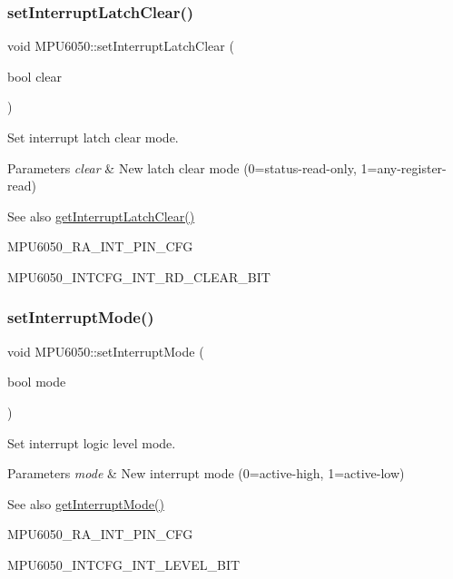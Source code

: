 \subsubsection{\texorpdfstring{setInterruptLatchClear()}{setInterruptLatchClear()}}
{\footnotesize\ttfamily void M\+P\+U6050\+::set\+Interrupt\+Latch\+Clear (\begin{DoxyParamCaption}\item[{bool}]{clear }\end{DoxyParamCaption})}

Set interrupt latch clear mode. 
\begin{DoxyParams}{Parameters}
{\em clear} & New latch clear mode (0=status-\/read-\/only, 1=any-\/register-\/read) \\
\hline
\end{DoxyParams}
\begin{DoxySeeAlso}{See also}
\mbox{\hyperlink{class_m_p_u6050_a9a098a607e20c64b60e155da35b8264f}{get\+Interrupt\+Latch\+Clear()}} 

M\+P\+U6050\+\_\+\+R\+A\+\_\+\+I\+N\+T\+\_\+\+P\+I\+N\+\_\+\+C\+FG 

M\+P\+U6050\+\_\+\+I\+N\+T\+C\+F\+G\+\_\+\+I\+N\+T\+\_\+\+R\+D\+\_\+\+C\+L\+E\+A\+R\+\_\+\+B\+IT 
\end{DoxySeeAlso}
\mbox{\label{class_m_p_u6050_a003a098a1521c5ef4df50c0a8a2d47ab}} 
\subsubsection{\texorpdfstring{setInterruptMode()}{setInterruptMode()}}
{\footnotesize\ttfamily void M\+P\+U6050\+::set\+Interrupt\+Mode (\begin{DoxyParamCaption}\item[{bool}]{mode }\end{DoxyParamCaption})}

Set interrupt logic level mode. 
\begin{DoxyParams}{Parameters}
{\em mode} & New interrupt mode (0=active-\/high, 1=active-\/low) \\
\hline
\end{DoxyParams}
\begin{DoxySeeAlso}{See also}
\mbox{\hyperlink{class_m_p_u6050_a58da1dfb39eb34e3a09a9b0bf4d87f29}{get\+Interrupt\+Mode()}} 

M\+P\+U6050\+\_\+\+R\+A\+\_\+\+I\+N\+T\+\_\+\+P\+I\+N\+\_\+\+C\+FG 

M\+P\+U6050\+\_\+\+I\+N\+T\+C\+F\+G\+\_\+\+I\+N\+T\+\_\+\+L\+E\+V\+E\+L\+\_\+\+B\+IT 
\end{DoxySeeAlso}
\mbox{\label{class_m_p_u6050_a83710a6b1e07f3b385239cc06f275cdb}} 
